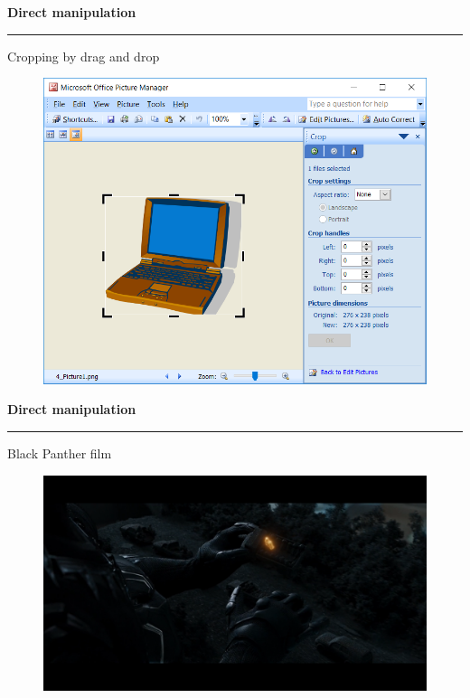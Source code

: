 \documentclass[pdf]{beamer}
\begin{document}
\begin{frame}
{\textbf{Direct manipulation}}{\textcolor{red}{\rule{12cm}{1.2pt}}}

Cropping by drag and drop

\begin{figure}
\includegraphics[scale=0.5]{Direct_manipulation_Cropping.png}
\end{figure}
        
\end{frame}



\begin{frame}
{\textbf{Direct manipulation}}{\textcolor{red}{\rule{12cm}{1.2pt}}}

Black Panther film

\vspace{-0.5cm}

\begin{figure}
\centering
\includegraphics[scale=0.27]{Black_Panther_DM_1.png}
\end{figure}
        
\end{frame}
\end{document}
